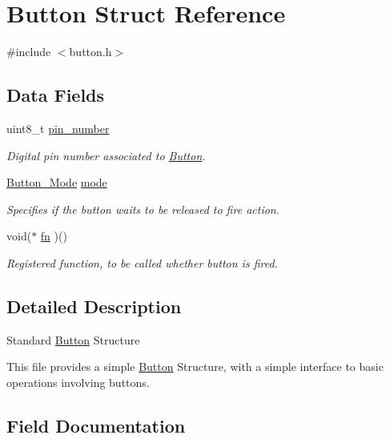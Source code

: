 \hypertarget{structButton}{}\section{Button Struct Reference}
\label{structButton}


{\ttfamily \#include $<$button.\+h$>$}

\subsection*{Data Fields}
\begin{DoxyCompactItemize}
\item 
uint8\+\_\+t \mbox{\hyperlink{structButton_af928b8cec60e2319e1a624edd40c878d}{pin\+\_\+number}}
\begin{DoxyCompactList}\small\item\em Digital pin number associated to \mbox{\hyperlink{structButton}{Button}}. \end{DoxyCompactList}\item 
\mbox{\hyperlink{button_8h_a9a185102e3c0ad41aac006e0e2fcb190}{Button\+\_\+\+Mode}} \mbox{\hyperlink{structButton_aef2b69645163f24a3c019f6695f08843}{mode}}
\begin{DoxyCompactList}\small\item\em Specifies if the button waits to be released to fire action. \end{DoxyCompactList}\item 
void($\ast$ \mbox{\hyperlink{structButton_a2eefdfa81c0be7bdd169a46cc9a0407a}{fn}} )()
\begin{DoxyCompactList}\small\item\em Registered function, to be called whether button is fired. \end{DoxyCompactList}\end{DoxyCompactItemize}


\subsection{Detailed Description}
Standard \mbox{\hyperlink{structButton}{Button}} Structure

This file provides a simple \mbox{\hyperlink{structButton}{Button}} Structure, with a simple interface to basic operations involving buttons. 

\subsection{Field Documentation}
\mbox{\label{structButton_a2eefdfa81c0be7bdd169a46cc9a0407a}} 
